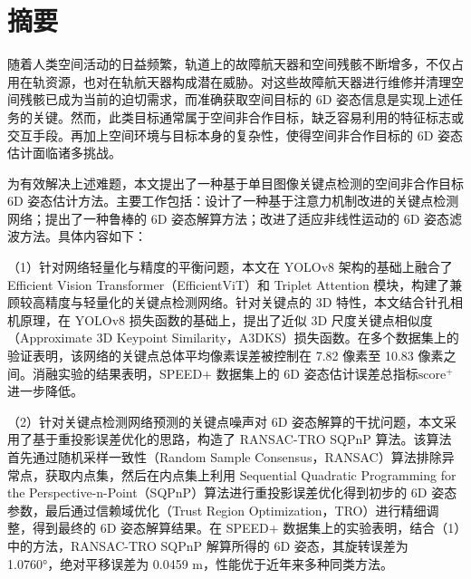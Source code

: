\maketitle %
\MAKETITLE %


\makedeclaration %

\intotoc\chapter*{摘\qquad 要}%
\setcounter{page}{1}%
随着人类空间活动的日益频繁，轨道上的故障航天器和空间残骸不断增多，不仅占用在轨资源，也对在轨航天器构成潜在威胁。对这些故障航天器进行维修并清理空间残骸已成为当前的迫切需求，而准确获取空间目标的 6D 姿态信息是实现上述任务的关键。然而，此类目标通常属于空间非合作目标，缺乏容易利用的特征标志或交互手段。再加上空间环境与目标本身的复杂性，使得空间非合作目标的 6D 姿态估计面临诸多挑战。

为有效解决上述难题，本文提出了一种基于单目图像关键点检测的空间非合作目标 6D 姿态估计方法。主要工作包括：设计了一种基于注意力机制改进的关键点检测网络；提出了一种鲁棒的 6D 姿态解算方法；改进了适应非线性运动的 6D 姿态滤波方法。具体内容如下：

（1）针对网络轻量化与精度的平衡问题，本文在 YOLOv8 架构的基础上融合了 Efficient Vision Transformer（EfficientViT）和 Triplet Attention 模块，构建了兼顾较高精度与轻量化的关键点检测网络。针对关键点的 3D 特性，本文结合针孔相机原理，在 YOLOv8 损失函数的基础上，提出了近似 3D 尺度关键点相似度（Approximate 3D Keypoint Similarity，A3DKS）损失函数。在多个数据集上的验证表明，该网络的关键点总体平均像素误差被控制在 7.82 像素至 10.83 像素之间。消融实验的结果表明，SPEED+ 数据集上的 6D 姿态估计误差总指标$\mathrm{score}^+$进一步降低。

（2）针对关键点检测网络预测的关键点噪声对 6D 姿态解算的干扰问题，本文采用了基于重投影误差优化的思路，构造了 RANSAC-TRO SQPnP 算法。该算法首先通过随机采样一致性（Random Sample Consensus，RANSAC）算法排除异常点，获取内点集，然后在内点集上利用 Sequential Quadratic Programming for the Perspective-n-Point（SQPnP）算法进行重投影误差优化得到初步的 6D 姿态参数，最后通过信赖域优化（Trust Region Optimization，TRO）进行精细调整，得到最终的 6D 姿态解算结果。在 SPEED+ 数据集上的实验表明，结合（1）中的方法，RANSAC-TRO SQPnP 解算所得的 6D 姿态，其旋转误差为 1.0760°，绝对平移误差为 0.0459 m，性能优于近年来多种同类方法。

